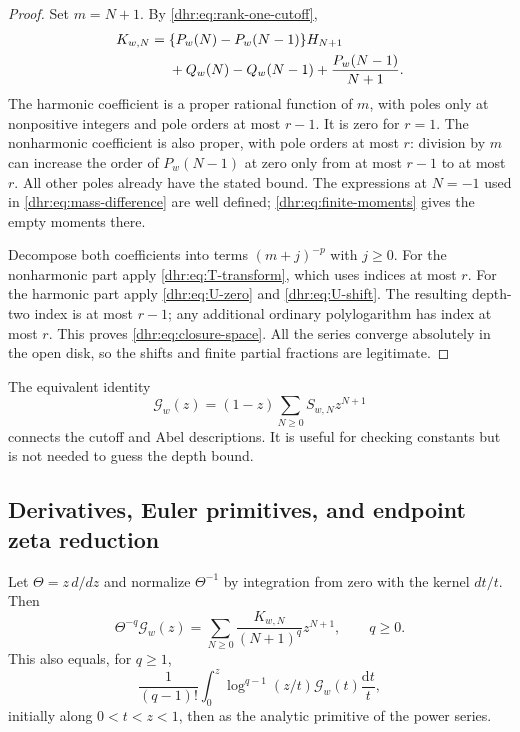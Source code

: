 \documentclass[11pt,letterpaper]{article}
\numberwithin{equation}{section}
\theoremstyle{definition}\newtheorem{definition}[theorem]{Definition}
\theoremstyle{remark}\newtheorem{remark}[theorem]{Remark}
\begin{document}
\begin{proof}
Set $m=N+1$. By \eqref{dhr:eq:rank-one-cutoff},
\begin{align}
 K_{w,N}={}&\{P_w(N)-P_w(N-1)\}H_{N+1}\notag\\
          &+Q_w(N)-Q_w(N-1)+\frac{P_w(N-1)}{N+1}.
 \label{dhr:eq:mass-difference}
\end{align}
The harmonic coefficient is a proper rational function of $m$,
with poles only at nonpositive integers and pole orders at most $r-1$.
It is zero for $r=1$. The nonharmonic coefficient is also proper,
with pole orders at most $r$: division by $m$ can increase the
order of $P_w(N-1)$ at zero only from at most $r-1$ to at most $r$.
All other poles already have the stated bound. The expressions at
$N=-1$ used in \eqref{dhr:eq:mass-difference} are well defined;
\eqref{dhr:eq:finite-moments} gives the empty moments there.

Decompose both coefficients into terms $(m+j)^{-p}$ with $j\geq0$.
For the nonharmonic part apply \eqref{dhr:eq:T-transform}, which
uses indices at most $r$. For the harmonic part apply
\eqref{dhr:eq:U-zero} and \eqref{dhr:eq:U-shift}. The resulting depth-two
index is at most $r-1$; any additional ordinary polylogarithm has
index at most $r$. This proves \eqref{dhr:eq:closure-space}.
All the series converge absolutely in the open disk, so the shifts
and finite partial fractions are legitimate.
\end{proof}

The equivalent identity
\begin{equation}\label{dhr:eq:Abel-cutoff}
 \mathcal G_w(z)=(1-z)\sum_{N\geq0}S_{w,N}z^{N+1}
\end{equation}
connects the cutoff and Abel descriptions. It is useful for checking
constants but is not needed to guess the depth bound.

\subsection{Derivatives, Euler primitives, and endpoint zeta reduction}
Let $\Theta=z\,d/dz$ and normalize $\Theta^{-1}$ by integration from
zero with the kernel $dt/t$. Then
\begin{equation}\label{dhr:eq:Euler-primitive}
 \Theta^{-q}\mathcal G_w(z)=
 \sum_{N\geq0}\frac{K_{w,N}}{(N+1)^q}z^{N+1},\qquad q\geq0.
\end{equation}
This also equals, for $q\geq1$,
\begin{equation}\label{dhr:eq:Euler-integral}
 \frac1{(q-1)!}\int_0^z\log^{q-1}(z/t)
                       \mathcal G_w(t)\frac{\mathrm dt}{t},
\end{equation}
initially along $0<t<z<1$, then as the analytic primitive of the
power series.
\end{document}
